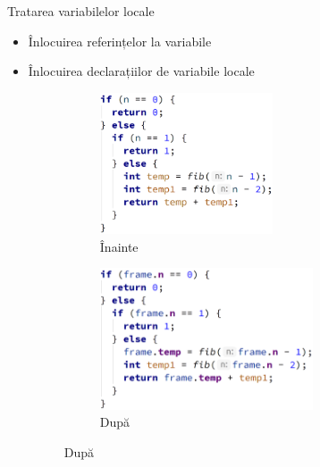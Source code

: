 \documentclass{beamer}
\begin{document}
\begin{frame}{Tratarea variabilelor locale}
    \begin{itemize}
        \item Înlocuirea referințelor la variabile
        \item Înlocuirea declarațiilor de variabile locale
        \begin{figure}[htb]
            \begin{subfigure}[b]{.48\textwidth}
                \centering
                \includegraphics[height=1.65in]{img/ref-var-before.png}
                \caption{Înainte}
            \end{subfigure}
            \begin{subfigure}[b]{.48\textwidth}
                \centering
                \includegraphics[height=1.65in]{img/ref-var-after.png}
                \caption{După}
            \end{subfigure}
        \end{figure}
    \end{itemize}
\end{frame}

\end{document}
